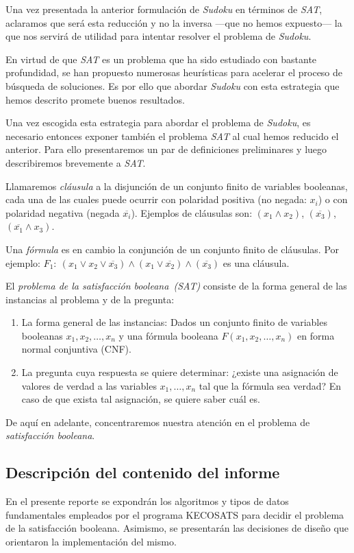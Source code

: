 \documentclass[12pt,lettersize,oneside]{article}
\begin{document}
Una vez presentada la anterior formulación de \emph{Sudoku} en términos de
\emph{SAT}, aclaramos que será esta reducción y no la inversa ---que no hemos
expuesto--- la que nos servirá de utilidad para intentar resolver el problema de
\emph{Sudoku}.

En virtud de que \emph{SAT} es un problema que ha sido estudiado con bastante
profundidad, se han propuesto numerosas heurísticas para acelerar el proceso de
búsqueda de soluciones. Es por ello que abordar \emph{Sudoku} con esta
estrategia que hemos descrito promete buenos resultados.

Una vez escogida esta estrategia para abordar el problema de \emph{Sudoku}, es
necesario entonces exponer también el problema \emph{SAT} al cual hemos
reducido el anterior. Para ello presentaremos un par de definiciones
preliminares y luego describiremos brevemente a \emph{SAT}.

 Llamaremos \emph{cláusula} a la disjunción de un conjunto finito de
variables booleanas, cada una de las cuales puede ocurrir con polaridad positiva
(no negada: $x_i$) o con polaridad negativa (negada $\overline{x_i}$).  Ejemplos
de cláusulas son: $(x_1 \wedge x_2)$, $(\overline{x_3})$, $(\overline{x_1}
\wedge x_3)$.

Una \emph{fórmula} es en cambio la conjunción de un conjunto finito de
cláusulas. Por ejemplo: $F_1:\ (x_1 \vee x_2 \vee \overline{x_3}) \wedge (x_1
\vee \overline{x_2}) \wedge (\overline{x_3})$ es una cláusula.

El \emph{problema de la satisfacción booleana~(SAT)} consiste de la
forma general de las instancias al problema y de la pregunta: \vspace{-2.5mm}
\begin{enumerate}
\item La forma general de las instancias: Dados un conjunto finito de variables
  booleanas $x_1,x_2,\ldots,x_n$ y una fórmula booleana $F(x_1,x_2,\ldots,x_n)$
  en forma normal conjuntiva (CNF).
\item La pregunta cuya respuesta se quiere determinar: ¿existe una asignación de
  valores de verdad a las variables $x_1,\ldots, x_n$ tal que la fórmula sea
  verdad? En caso de que exista tal asignación, se quiere saber cuál es.
\end{enumerate}

De aquí en adelante, concentraremos nuestra atención en el problema de
\emph{satisfacción booleana}.

\subsection{Descripción del contenido del informe}
En el presente reporte se expondrán los algoritmos y tipos de datos
fundamentales empleados por el programa KECOSATS para decidir el problema de la
satisfacción booleana. Asimismo, se presentarán las decisiones de diseño que
orientaron la implementación del mismo.
\end{document}
